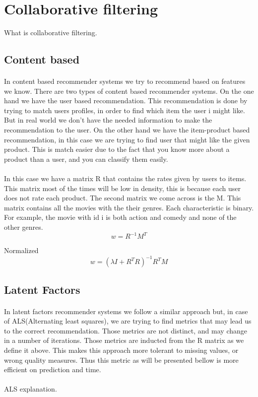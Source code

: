 \section{Collaborative filtering}
What is collaborative filtering.
\cite{RecommenderSystems:2}
\subsection{Content based}

\paragraph{}In content based recommender systems we try to recommend based on features we know. There are two types of content based recommender systems. On the one hand we have the user based recommendation. This recommendation is done by trying to match users profiles, in order to find which item the user i might like. But in real world we don't have the needed information to make the recommendation to the user. On the other hand we have the item-product based recommendation, in this case we are trying to find user that might like the given product. This is match easier due to the fact that you know more about a product than a user, and you can classify them easily.
\paragraph{}In this case we have a matrix R that contains the rates given by users to items. This matrix most of the times will be low in density, this is because each user does not rate each product. The second matrix we come across is the M. This matrix contains all the movies with the their genres. Each characteristic is binary. For example, the movie with id i is both action and comedy and none of the other genres.
\begin{equation}
 w=R^{-1}M^{T}
\end{equation}

Normalized \\
\begin{equation}
 w=(\lambda I + R^{T}R)^{-1} R^{T}M 
\end{equation}

\subsection{Latent Factors}
\paragraph{} In latent factors recommender systems we follow a similar approach but, in case of ALS(Alternating least squares), we are trying to find metrics that may lead us to the correct recommendation. Those metrics are not distinct, and may change in a number of iterations. Those metrics are inducted from the R matrix as we define it above. This makes this approach more tolerant to missing values, or wrong quality measures. Thus this metric as will be presented bellow is more efficient on prediction and time.

\paragraph{} ALS explanation.
